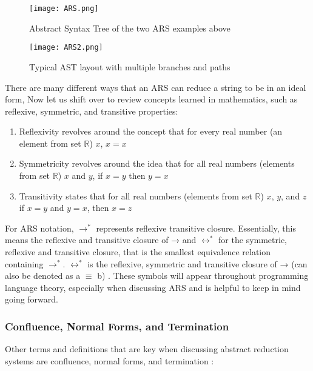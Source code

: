 \documentclass{article}
\begin{document}
\begin{figure}[H]
    \centering
    \texttt{[image: ARS.png]}
    \caption{Abstract Syntax Tree of the two ARS examples above}
    \label{fig:art}
\end{figure}

\begin{figure}[H]
    \centering
    \texttt{[image: ARS2.png]}
    \caption{Typical AST layout with multiple branches and paths}
    \label{fig:art2}
\end{figure}

\medskip\noindent
There are many different ways that an ARS can reduce a string to be in an ideal form, Now let us shift over to review concepts learned in mathematics, such as reflexive, symmetric, and transitive properties:

\begin{enumerate}
    \item Reflexivity revolves around the concept that for every real number (an element from set $\mathbb R$) $x$, $x = x$
    \item Symmetricity revolves around the idea that for all real numbers (elements from set $\mathbb R$) $x$ and $y$, if $x = y$ then $y = x$ 
    \item Transitivity states that for all real numbers (elements from set $\mathbb R$) $x$, $y$, and $z$ if $x = y$ and $y = x$, then $x = z$
\end{enumerate}

\medskip\noindent
For ARS notation, $\rightarrow^*$ represents reflexive transitive closure. Essentially, this means the reflexive and transitive closure of → and $\longleftrightarrow^*$  for the symmetric, reflexive and transitive closure, that is the smallest equivalence relation containing $\rightarrow^*$. $\longleftrightarrow^*$ is the reflexive, symmetric and transitive closure of → (can also be denoted as a $\equiv$ b) \cite{PL}. These symbols will appear throughout programming language theory, especially when discussing ARS and is helpful to keep in mind going forward.

\subsubsection{Confluence, Normal Forms, and Termination}

Other terms and definitions that are key when discussing abstract reduction systems are confluence, normal forms, and termination \cite{PL}:
\end{document}
